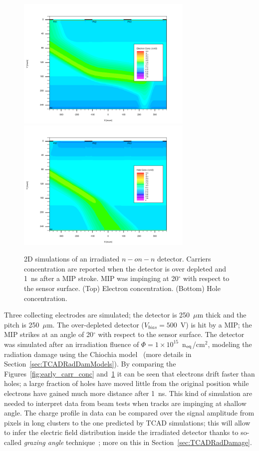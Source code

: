 \begin{figure}[!htbp]
\centering
\includegraphics[width=0.75\textwidth]{econ_late.png}
\includegraphics[width=0.75\textwidth]{hcon_late.png}
\caption{\label{fig:late_carr_conc}2D simulations of an irradiated $n-on-n$ detector. Carriers concentration
are reported when the detector is over depleted and 1~ns after a MIP stroke. 
MIP was impinging at 20$^{\circ}$ with respect to the sensor surface. (Top) Electron concentration. 
(Bottom) Hole concentration.}
\end{figure}
Three collecting electrodes are simulated; the detector is 250~$\mu$m thick and the pitch 
is 250~$\mu$m. The over-depleted detector ($V_{bias} = 500$~V) is hit by a MIP; the MIP strikes at 
an angle of 20$^{\circ}$ with respect to the sensor surface. The detector was simulated after 
an irradiation fluence of $\Phi=1\times10^{15}$~n$_{\rm eq}$/cm$^2$, modeling the radiation damage using the Chiochia model~\cite{CHIOCHIA2006} (more details in Section~\ref{sec:TCADRadDamModels}).
By comparing the Figures~\ref{fig:early_carr_conc} and~\ref{fig:late_carr_conc} 
it can be seen that electrons drift faster than holes; a large fraction of holes 
have moved little from the original position while electrons have gained much more distance 
after 1~ns. 
This kind of simulation are needed to interpret data from  beam tests when tracks are impinging 
at shallow angle. The charge profile in data can be compared over the signal amplitude from pixels in 
long clusters to the one predicted by TCAD simulations; this will allow to infer the electric field 
distribution inside the irradiated detector thanks to so-called {\it grazing angle} 
technique~\cite{Henrich:687041,Lari:2001qqa,LARI2004349}; more 
on this in Section~\ref{sec:TCADRadDamage}.

